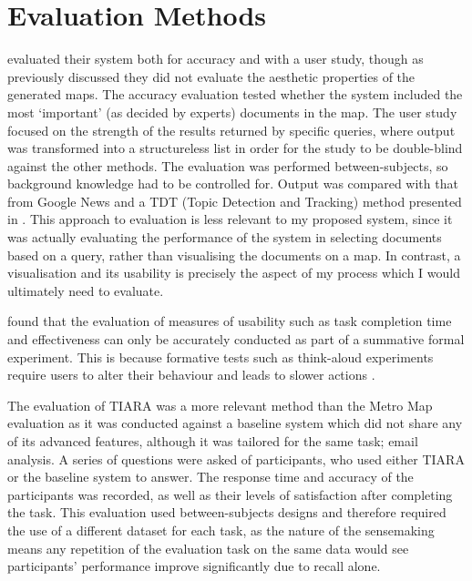 \section{Evaluation Methods}
\citet{GeneratingInformationMaps} evaluated their system both for accuracy and with a user study, though as previously discussed they did not evaluate the aesthetic properties of the generated maps. The accuracy evaluation tested whether the system included the most `important' (as decided by experts) documents in the map. The user study focused on the strength of the results returned by specific queries, where output was transformed into a structureless list in order for the study to be double-blind against the other methods. The evaluation was performed between-subjects, so background knowledge had to be controlled for. Output was compared with that from Google News and a TDT (Topic Detection and Tracking) method presented in \citep{SemanticLanguageModelsForTDT}. This approach to evaluation is less relevant to my proposed system, since it was actually evaluating the performance of the system in selecting documents based on a query, rather than visualising the documents on a map. In contrast, a visualisation and its usability is precisely the aspect of my process which I would ultimately need to evaluate.

\citet{EvaluatingInformationVisualisations} found that the evaluation of measures of usability such as task completion time and effectiveness can only be accurately conducted as part of a summative formal experiment. This is because formative tests such as think-aloud experiments require users to alter their behaviour and leads to slower actions \citep{VerbalReportsAsData}.

The evaluation of TIARA \citep{InteractiveTopicBasedVisualTextSummarizationAndAnalysis} was a more relevant method than the Metro Map evaluation as it was conducted against a baseline system which did not share any of its advanced features, although it was tailored for the same task; email analysis. A series of questions were asked of participants, who used either TIARA or the baseline system to answer. The response time and accuracy of the participants was recorded, as well as their levels of satisfaction after completing the task. This evaluation used between-subjects designs and therefore required the use of a different dataset for each task, as the nature of the sensemaking means any repetition of the evaluation task on the same data would see participants' performance improve significantly due to recall alone.

